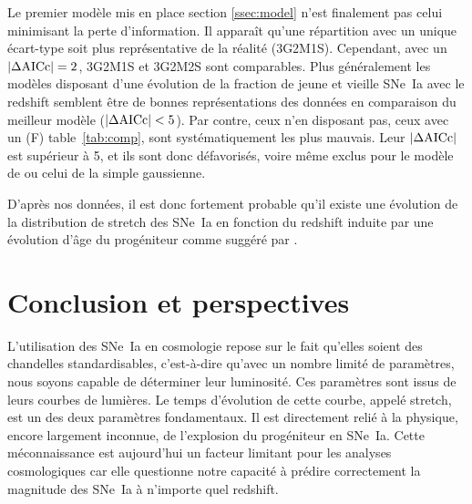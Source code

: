 \documentclass[a4paper, 12pt, svgnames]{article}
\begin{document}
Le premier modèle mis en place section \ref{ssec:model} n'est finalement pas
celui minimisant la perte d'information. Il apparaît qu'une répartition avec un
unique écart-type soit plus représentative de la réalité (3G2M1S). Cependant,
avec un $\abs{\Delta\mathrm{AICc}}=2$, 3G2M1S et 3G2M2S sont comparables. Plus
généralement les modèles disposant d'une évolution de la fraction de jeune et
vieille SNe~Ia avec le redshift semblent être de bonnes représentations des
données en comparaison du meilleur modèle ($\abs{\Delta\mathrm{AICc}}<5$). Par
contre, ceux n'en disposant pas, ceux avec un (F) table~\ref{tab:comp}, sont
systématiquement les plus mauvais. Leur $\abs{\Delta\mathrm{AICc}}$ est supérieur à
5, et ils sont donc défavorisés, voire même exclus pour le modèle de
\cite{kessler_correcting_2017} ou celui de la simple gaussienne. \bigbreak

D'après nos données, il est donc fortement probable qu'il existe une évolution
de la distribution de stretch des SNe~Ia en fonction du redshift induite par une
évolution d'âge du progéniteur comme suggéré par \cite{howell_effect_2009,
rigault_evidence_2013, rigault_strong_2018}.

\section{Conclusion et perspectives}\label{sec:conc}

L'utilisation des SNe~Ia en cosmologie repose sur le fait qu'elles soient des
chandelles standardisables, c'est-à-dire qu'avec un nombre limité de paramètres,
nous soyons capable de déterminer leur luminosité. Ces paramètres sont issus de
leurs courbes de lumières. Le temps d'évolution de cette courbe, appelé stretch,
est un des deux paramètres fondamentaux. Il est directement relié à la physique,
encore largement inconnue, de l'explosion du progéniteur en SNe~Ia. Cette
méconnaissance est aujourd'hui un facteur limitant pour les analyses
cosmologiques car elle questionne notre capacité à prédire correctement la
magnitude des SNe~Ia à n'importe quel redshift. \bigbreak
\end{document}
